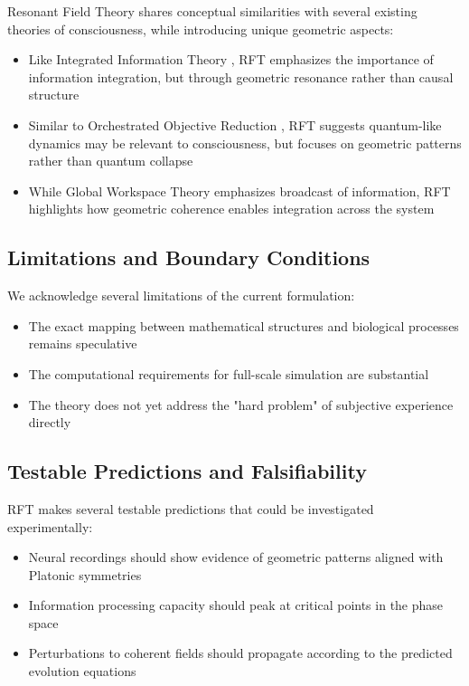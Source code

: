 \documentclass[12pt,letterpaper]{article}
\begin{document}
Resonant Field Theory shares conceptual similarities with several existing theories of consciousness, while introducing unique geometric aspects:

\begin{itemize}
    \item Like Integrated Information Theory \cite{tononi2016integrated}, RFT emphasizes the importance of information integration, but through geometric resonance rather than causal structure
    \item Similar to Orchestrated Objective Reduction \cite{hameroff2014consciousness}, RFT suggests quantum-like dynamics may be relevant to consciousness, but focuses on geometric patterns rather than quantum collapse
    \item While Global Workspace Theory \cite{dehaene2014consciousness} emphasizes broadcast of information, RFT highlights how geometric coherence enables integration across the system
\end{itemize}

\vspace{2mm}
\subsection{Limitations and Boundary Conditions}
\label{subsec:limitations}

We acknowledge several limitations of the current formulation:

\begin{itemize}
    \item The exact mapping between mathematical structures and biological processes remains speculative
    \item The computational requirements for full-scale simulation are substantial
    \item The theory does not yet address the "hard problem" of subjective experience directly
\end{itemize}

\vspace{2mm}
\subsection{Testable Predictions and Falsifiability}
\label{subsec:testable_predictions}

RFT makes several testable predictions that could be investigated experimentally:

\begin{itemize}
    \item Neural recordings should show evidence of geometric patterns aligned with Platonic symmetries
    \item Information processing capacity should peak at critical points in the phase space
    \item Perturbations to coherent fields should propagate according to the predicted evolution equations
\end{itemize}
\end{document}
